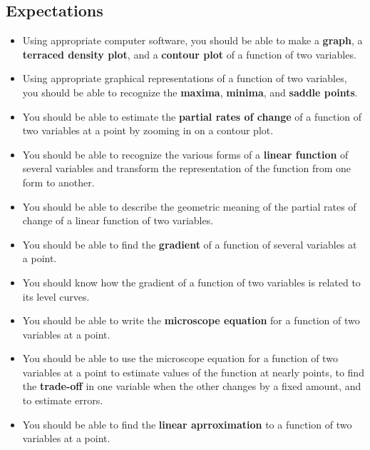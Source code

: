 \subsection{Expectations}
\label{subsec:expectations}

\begin{itemize}

\item Using appropriate computer software, you should be able to make
  a \textbf{graph}, a \textbf{terraced density plot}, and a
  \textbf{contour plot} of a function of two variables.

\item Using appropriate graphical representations of a function of two
  variables, you should be able to recognize the \textbf{maxima},
  \textbf{minima}, and \textbf{saddle points}.

\item You should be able to estimate the \textbf{partial rates of
  change} of a function of two variables at a point by zooming in on a
  contour plot.

\item You should be able to recognize the various forms of a
  \textbf{linear function} of several variables and transform the
  representation of the function from one form to another.

\item You should be able to describe the geometric meaning of the
  partial rates of change of a linear function of two variables.

\item You should be able to find the \textbf{gradient} of a function
  of several variables at a point.

\item You should know how the gradient of a function of two variables
  is related to its level curves.


\item You should be able to write the \textbf{microscope equation} for
  a function of two variables at a point.

\item You should be able to use the microscope equation for a function
  of two variables at a point to estimate values of the function at
  nearly points, to find the \textbf{trade-off} in one variable when
  the other changes by a fixed amount, and to estimate errors.

\item You should be able to find the \textbf{linear aprroximation} to
  a function of two variables at a point.


\end{itemize}
